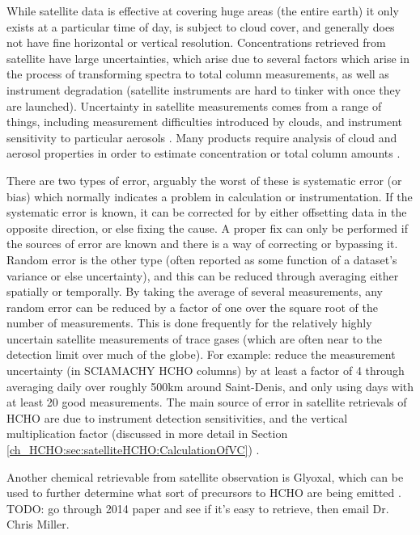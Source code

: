     While satellite data is effective at covering huge areas (the entire earth) it only exists at a particular time of day, is subject to cloud cover, and generally does not have fine horizontal or vertical resolution.
    Concentrations retrieved from satellite have large uncertainties, which arise due to several factors which arise in the process of transforming spectra to total column measurements, as well as instrument degradation (satellite instruments are hard to tinker with once they are launched).
    Uncertainty in satellite measurements comes from a range of things, including measurement difficulties introduced by clouds, and instrument sensitivity to particular aerosols \citep{Millet2006}.
    Many products require analysis of cloud and aerosol properties in order to estimate concentration or total column amounts \citep{Palmer2001,Palmer2003, Marais2012, Vasilkov2017}.
    
    There are two types of error, arguably the worst of these is systematic error (or bias) which normally indicates a problem in calculation or instrumentation.
    If the systematic error is known, it can be corrected for by either offsetting data in the opposite direction, or else fixing the cause.
    A proper fix can only be performed if the sources of error are known and there is a way of correcting or bypassing it.
    Random error is the other type (often reported as some function of a dataset's variance or else uncertainty), and this can be reduced through averaging either spatially or temporally. 
    By taking the average of several measurements, any random error can be reduced by a factor of one over the square root of the number of measurements.
    This is done frequently for the relatively highly uncertain satellite measurements of trace gases (which are often near to the detection limit over much of the globe).
    For example: \citet{Vigouroux2009} reduce the measurement uncertainty (in SCIAMACHY HCHO columns) by at least a factor of 4 through averaging daily over roughly 500km around Saint-Denis, and only using days with at least 20 good measurements.
    The main source of error in satellite retrievals of HCHO are due to instrument detection sensitivities, and the vertical multiplication factor (discussed in more detail in Section \ref{ch_HCHO:sec:satelliteHCHO:CalculationOfVC}) \citep{Millet2006}.
    
  Another chemical retrievable from satellite observation is Glyoxal, which can be used to further determine what sort of precursors to HCHO are being emitted \citep{Miller2014, Miller2017}.
  TODO: go through 2014 paper and see if it's easy to retrieve, then email Dr. Chris Miller.

